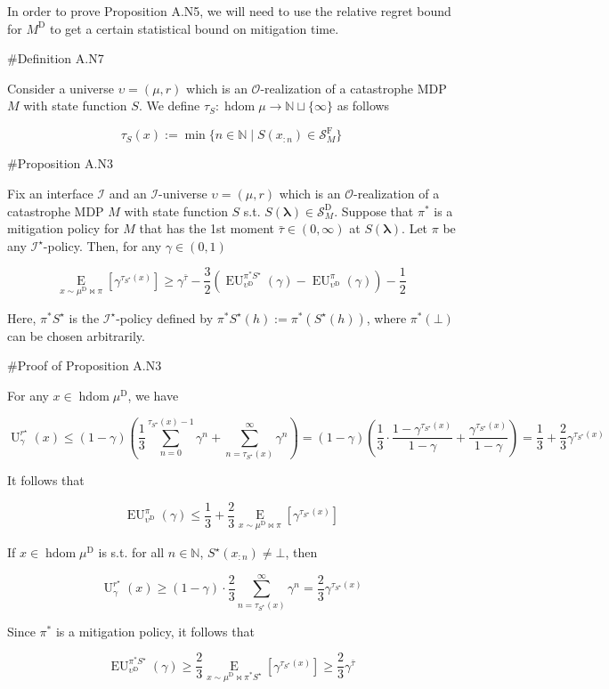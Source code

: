 \documentclass[a4paper]{article}
\newcommand{\AP}[1]{\left(#1\right)}
\newcommand{\AB}[1]{\left[#1\right]}
\newcommand{\Ea}[2]{\underset{#1}{\operatorname{E}}\AB{#2}}
\newcommand{\Nats}{\mathbb{N}}
\newcommand{\Estr}{\boldsymbol{\lambda}}
\newcommand{\Ob}{\mathcal{O}}
\newcommand{\St}{\mathcal{S}}
\newcommand{\In}{\mathcal{I}}
\DeclareMathOperator{\HD}{hdom}
\newcommand{\RMD}{\mathrm{D}}
\newcommand{\RMF}{\mathrm{F}}
\newcommand{\SF}{\St^{\RMF}}
\newcommand{\SD}{\St^{\RMD}}
\newcommand{\MD}{M^{\RMD}}
\newcommand{\UD}{\upsilon^{\RMD}}
\newcommand{\Ut}{\operatorname{U}}
\newcommand{\EU}{\operatorname{EU}}
\begin{document}
In order to prove Proposition A.N5, we will need to use the relative regret bound for $\MD$ to get a certain statistical bound on mitigation time.

\#Definition A.N7

Consider a universe $\upsilon=(\mu,r)$ which is an $\Ob$-realization of a catastrophe MDP $M$ with state function $S$. We define $\tau_S: \HD{\mu} \rightarrow \Nats \sqcup \{\infty\}$ as follows

$$\tau_S(x) := \min\{n \in \Nats \mid S\AP{x_{:n}} \in \SF_M\}$$

\#Proposition A.N3

Fix an interface $\In$ and an $\In$-universe $\upsilon=(\mu,r)$ which is an $\Ob$-realization of a catastrophe MDP $M$ with state function $S$ s.t. $S(\Estr)\in\SD_M$. Suppose that $\pi^*$ is a mitigation policy for $M$ that has the 1st moment $\bar{\tau}\in(0,\infty)$ at $S(\Estr)$. Let $\pi$ be any $\In^\star$-policy. Then, for any $\gamma\in(0,1)$

$$\Ea{x\sim\mu^\RMD\bowtie\pi}{\gamma^{\tau_{S^\star}(x)}} \geq {\gamma^{\bar{\tau}}}-\frac{3}{2}\AP{\EU_{\UD}^{\pi^* S^\star}(\gamma)-\EU_{\UD}^{\pi}(\gamma)}-\frac{1}{2}$$

Here, $\pi^* S^\star$ is the $\In^\star$-policy defined by $\pi^*S^\star(h):=\pi^*\AP{S^\star(h)}$, where $\pi^*(\bot)$ can be chosen arbitrarily.

\#Proof of Proposition A.N3

For any $x \in \HD{\mu^\RMD}$, we have

$$\Ut^{r^\star}_\gamma(x) \leq (1-\gamma)\AP{\frac{1}{3}\sum_{n=0}^{\tau_{S^\star}(x)-1}{\gamma^n} + \sum_{n=\tau_{S^\star}(x)}^\infty \gamma^n} = (1-\gamma)\AP{\frac{1}{3} \cdot \frac{1 - \gamma^{\tau_{S^\star}(x)}}{1-\gamma}+\frac{\gamma^{\tau_{S^\star}(x)}}{1-\gamma}}=\frac{1}{3}+\frac{2}{3}\gamma^{\tau_{S^\star}(x)}$$

It follows that

$$\EU_{\UD}^\pi(\gamma) \leq \frac{1}{3}+\frac{2}{3}\Ea{x\sim\mu^\RMD\bowtie\pi}{\gamma^{\tau_{S^\star}(x)}}$$

If $x \in \HD{\mu^\RMD}$ is s.t. for all $n\in\Nats$, $S^\star\AP{x_{:n}}\ne\bot$, then

$$\Ut^{r^\star}_\gamma(x) \geq (1-\gamma)\cdot \frac{2}{3} \sum_{n=\tau_{S^\star}(x)}^\infty \gamma^n = \frac{2}{3}\gamma^{\tau_{S^\star}(x)}$$

Since $\pi^*$ is a mitigation policy, it follows that

$$\EU_{\UD}^{\pi^*S^\star}(\gamma) \geq \frac{2}{3}\Ea{x\sim\mu^\RMD\bowtie\pi^*S^\star}{\gamma^{\tau_{S^\star}(x)}} \geq \frac{2}{3}\gamma^{\bar{\tau}}$$
\end{document}
